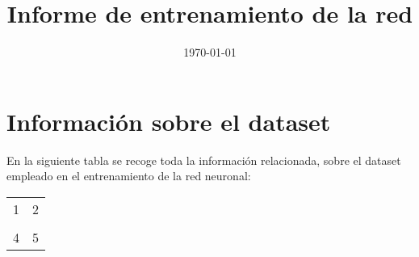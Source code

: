 \documentclass{article}%
\title{Informe de entrenamiento de la red}%
\date{\today}%
\begin{document}
%
\normalsize%
\maketitle%
\section{Información sobre el dataset}%
\label{sec:Informacinsobreeldataset}%
En la siguiente tabla se recoge toda la información          relacionada, sobre el dataset empleado en el entrenamiento de la red neuronal: %
\begin{tabular}{c|c}%
\hline%
1&2\\%
&\\%
4&5\\%
\hline%
\end{tabular}

%
\end{document}
